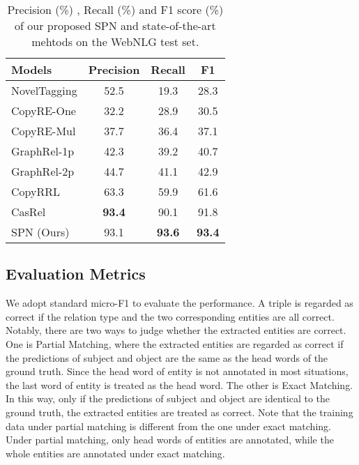 \documentclass[letterpaper]{article} \usepackage{aaai21}  \usepackage{times}  \usepackage{helvet} \usepackage{courier}  \usepackage[hyphens]{url}  \usepackage{graphicx} \usepackage{amsfonts,amssymb}
\begin{document}
\begin{table}[thbp]
\begin{center}
\begin{tabular}{l|ccc}
\hline
Models  & Precision    & Recall    & F1  \\
                                      \hline\hline
NovelTagging     & 52.5         & 19.3      & 28.3       \\
CopyRE-One   & 32.2         &28.9      & 30.5    \\
CopyRE-Mul & 37.7         &36.4     & 37.1    \\
GraphRel-1p        & 42.3         & 39.2     & 40.7    \\
GraphRel-2p           & 44.7         & 41.1     & 42.9  \\
CopyRRL       &63.3         & 59.9      & 61.6  \\
CasRel                       & \textbf{93.4}         & 90.1      & 91.8 \\
\hline
SPN (Ours) & 93.1         & \textbf{93.6}      & \textbf{93.4} \\  
\hline
\end{tabular}
\caption{Precision (\%) , Recall (\%)  and F1 score (\%) of our proposed SPN and state-of-the-art mehtods on the WebNLG test set.}
\label{WebNLG_result}
\end{center}
\end{table}

\subsection{Evaluation Metrics}
We adopt standard micro-F1 to evaluate the performance. A triple is regarded as correct if the relation type and the two corresponding entities are all correct. Notably, there are two ways to judge whether the extracted entities are correct. One is Partial Matching, where the extracted entities are regarded as correct if the predictions of subject and object are the same as the head words of the ground truth. Since the head word of entity is not annotated in most situations, the last word of entity is treated as the head word. The other is Exact Matching. In this way, only if the predictions of subject and object are identical to the ground truth, the extracted entities are treated as correct. Note that the training data under partial matching is different from the one under exact matching. Under partial matching, only head words of entities are annotated, while the whole entities  are annotated under exact matching.
\end{document}

